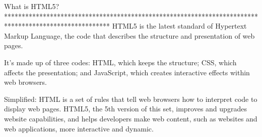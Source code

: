 What is HTML5?
******************************************************************************************************
HTML5 is the latest standard of Hypertext Markup Language, 
the code that describes the structure and presentation of web pages.

It’s made up of three codes: HTML, which keeps the structure;
CSS, which affects the presentation; 
and JavaScript, which creates interactive effects within web browsers.

Simplified:
    HTML is a set of rules that tell web browsers how to interpret code to display web pages.
    HTML5, the 5th version of this set, improves and upgrades website capabilities, 
    and helps developers make web content, such as websites and web applications,
     more interactive and dynamic.